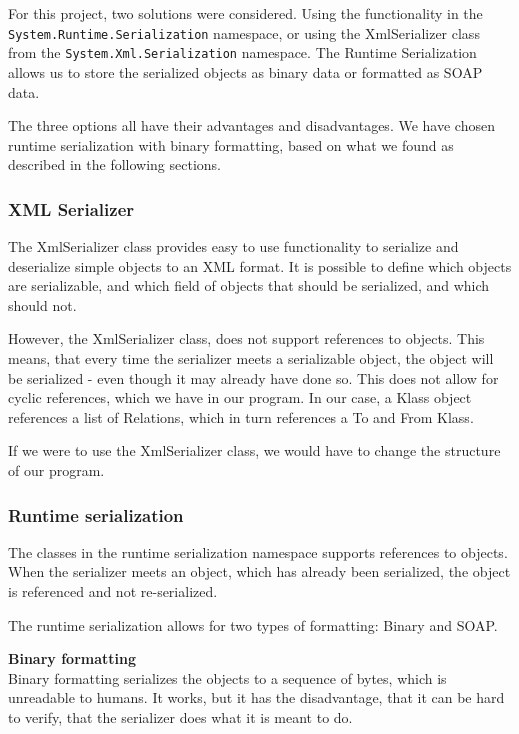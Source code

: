 For this project, two solutions were considered. Using the functionality in the
\texttt{System.Runtime.Serialization} namespace, or using the XmlSerializer
class from the \texttt{System.Xml.Serialization} namespace. The Runtime
Serialization allows us to store the serialized objects as binary data or
formatted as SOAP data.

The three options all have their advantages and disadvantages. We have chosen
runtime serialization with binary formatting, based on what we found as
described in the following sections.

\subsubsection{XML Serializer} 

The XmlSerializer class provides easy to use
functionality to serialize and deserialize simple objects to an XML format. It
is possible to define which objects are serializable, and which field of objects
that should be serialized, and which should not.

However, the XmlSerializer class, does not support references to objects. This
means, that every time the serializer meets a serializable object, the object
will be serialized - even though it may already have done so. This does not
allow for cyclic references, which we have in our program. In our case, a Klass
object references a list of Relations, which in turn references a To and From
Klass.

If we were to use the XmlSerializer class, we would have to change the structure
of our program.

\subsubsection{Runtime serialization} 

The classes in the runtime serialization
namespace supports references to objects. When the serializer meets an object,
which has already been serialized, the object is referenced and not
re-serialized.


The runtime serialization allows for two types of formatting: Binary and SOAP.

\textbf{Binary formatting}\\ Binary formatting serializes the objects to a
sequence of bytes, which is unreadable to humans. It works, but it has the
disadvantage, that it can be hard to verify, that the serializer does what it is
meant to do.

